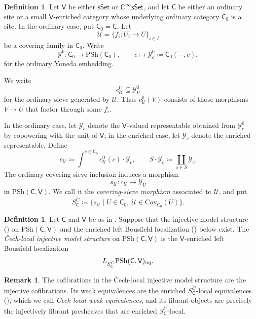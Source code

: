 \documentclass{amsart}
\newcommand{\cat}[1]{\mathsf{#1}}
\newcommand{\sset}{\cat{sSet}}
\newcommand{\inj}{\textnormal{inj}}
\newcommand{\CsSet}{\textnormal{C}^{\infty}\sset}
\newcommand{\psh}{\mathrm{PSh}}
\newcommand{\Yo}{\mathscr{Y}}
\theoremstyle{definition}
\newtheorem{definition}[equation]{Definition}
\newtheorem{remark}[equation]{Remark}
\numberwithin{equation}{subsection}
\numberwithin{subsubsection}{subsection}
\begin{document}
\begin{definition}\label{def:covering.sieve.morphism}
  Let \(\cat{V}\) be either \(\sset\) or \(\CsSet\), and let
  \(\cat{C}\) be either an ordinary site or a small \(\cat{V}\)-enriched
  category whose underlying ordinary category \(\cat{C}_0\) is a site. In
  the ordinary case, put \(\cat{C}_0=\cat{C}\). Let
  \[
    \mathcal{U}=\{f_i:U_i\to U\}_{i\in I}
  \]
  be a covering family in \(\cat{C}_0\). Write
  \[
    \Yo^0:\cat{C}_0\longrightarrow\psh(\cat{C}_0),
    \qquad
    c\longmapsto
    \Yo_c^0\coloneqq\cat{C}_0(-,c),
  \]
  for the ordinary Yoneda embedding.

  We write
  \[
    c_{\mathcal{U}}^{0}\subseteq\Yo_U^{0}
  \]
  for the ordinary sieve generated by \(\mathcal{U}\). Thus
  \(c_{\mathcal{U}}^{0}(V)\) consists of
  those morphisms \(V\to U\) that factor through some \(f_i\).

  In the ordinary case, let \(\Yo_c\) denote the \(\cat{V}\)-valued
  representable obtained from \(\Yo_c^0\) by copowering with the unit of
  \(\cat{V}\); in the enriched case, let \(\Yo_c\) denote the enriched
  representable. Define
  \[
    c_{\mathcal{U}}
    \coloneqq
    \int^{c\in\cat{C}_0}
    c_{\mathcal{U}}^{0}(c)\cdot\Yo_c,
    \qquad
    S\cdot\Yo_c\coloneqq\coprod_{s\in S}\Yo_c.
  \]
  The ordinary covering-sieve inclusion induces a morphism
  \[
    s_{\mathcal{U}}:
    c_{\mathcal{U}}\longrightarrow\Yo_U
  \]
  in \(\psh(\cat{C},\cat{V})\). We call it the \emph{covering-sieve
  morphism} associated to \(\mathcal{U}\), and put
  \[
    S_{\cat{C}}^{\check{C}}
    \coloneqq
    \{s_{\mathcal{U}}\mid
    U\in\cat{C}_0,\ \mathcal{U}\in\mathrm{Cov}_{\cat{C}_0}(U)\}.
  \]
\end{definition}

\begin{definition}\label{def:cech.local.injective.model.structure}
  Let \(\cat{C}\) and \(\cat{V}\) be as in
  . Suppose that the injective model
  structure () on \(\psh(\cat{C},\cat{V})\)
  and the enriched left Bousfield
  localization ()
  below exist. The \emph{\v{C}ech-local injective model
  structure} on \(\psh(\cat{C},\cat{V})\) is the \(\cat{V}\)-enriched left
  Bousfield localization
  \[
    L_{S_{\cat{C}}^{\check{C}}}
    \psh(\cat{C},\cat{V})_{\inj}.
  \]
\end{definition}

\begin{remark}
  The cofibrations in the \v{C}ech-local injective model structure
  are the injective cofibrations. Its weak equivalences are the enriched
  \(S_{\cat{C}}^{\check{C}}\)-local equivalences
  (), which we call
  \emph{\v{C}ech-local weak equivalences}, and its fibrant objects are
  precisely the injectively fibrant presheaves that are enriched
  \(S_{\cat{C}}^{\check{C}}\)-local.
\end{remark}
\end{document}
